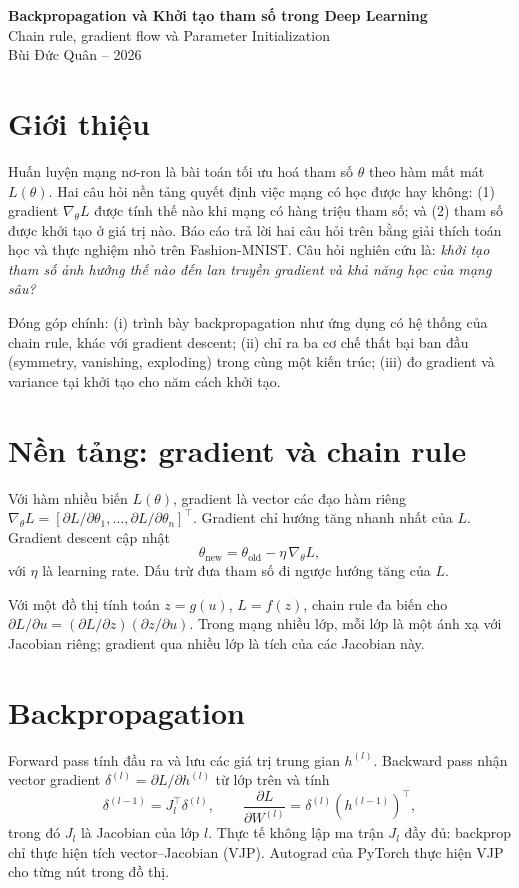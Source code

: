 \documentclass[12pt,a4paper]{article}
\begin{document}
\begin{center}
{\LARGE\bfseries Backpropagation và Khởi tạo tham số trong Deep Learning}\\[4pt]
{\large Chain rule, gradient flow và Parameter Initialization}\\[2pt]
{\normalsize Bùi Đức Quân -- 2026}
\end{center}

\section{Giới thiệu}
Huấn luyện mạng nơ-ron là bài toán tối ưu hoá tham số $\theta$ theo hàm mất mát $L(\theta)$. Hai câu hỏi nền tảng quyết định việc mạng có học được hay không:
(1) gradient $\nabla_\theta L$ được tính thế nào khi mạng có hàng triệu tham số; và
(2) tham số được khởi tạo ở giá trị nào.
Báo cáo trả lời hai câu hỏi trên bằng giải thích toán học và thực nghiệm nhỏ trên Fashion-MNIST. Câu hỏi nghiên cứu là: \emph{khởi tạo tham số ảnh hưởng thế nào đến lan truyền gradient và khả năng học của mạng sâu?}

Đóng góp chính: (i) trình bày backpropagation như ứng dụng có hệ thống của chain rule, khác với gradient descent; (ii) chỉ ra ba cơ chế thất bại ban đầu (symmetry, vanishing, exploding) trong cùng một kiến trúc; (iii) đo gradient và variance tại khởi tạo cho năm cách khởi tạo.

\section{Nền tảng: gradient và chain rule}
Với hàm nhiều biến $L(\theta)$, gradient là vector các đạo hàm riêng $\nabla_\theta L = [\partial L/\partial\theta_1,\dots,\partial L/\partial\theta_n]^\top$. Gradient chỉ hướng tăng nhanh nhất của $L$. Gradient descent cập nhật
\begin{equation}
\theta_{\text{new}} = \theta_{\text{old}} - \eta\,\nabla_\theta L,
\end{equation}
với $\eta$ là learning rate. Dấu trừ đưa tham số đi ngược hướng tăng của $L$.

Với một đồ thị tính toán $z = g(u)$, $L = f(z)$, chain rule đa biến cho $\partial L/\partial u = (\partial L/\partial z)(\partial z/\partial u)$. Trong mạng nhiều lớp, mỗi lớp là một ánh xạ với Jacobian riêng; gradient qua nhiều lớp là tích của các Jacobian này.

\section{Backpropagation}
Forward pass tính đầu ra và lưu các giá trị trung gian $h^{(l)}$. Backward pass nhận vector gradient $\delta^{(l)} = \partial L/\partial h^{(l)}$ từ lớp trên và tính
\begin{equation}
\delta^{(l-1)} = J_l^\top \delta^{(l)}, \qquad \frac{\partial L}{\partial W^{(l)}} = \delta^{(l)} (h^{(l-1)})^\top,
\end{equation}
trong đó $J_l$ là Jacobian của lớp $l$. Thực tế không lập ma trận $J_l$ đầy đủ: backprop chỉ thực hiện tích vector--Jacobian (VJP). Autograd của PyTorch thực hiện VJP cho từng nút trong đồ thị.
\end{document}
